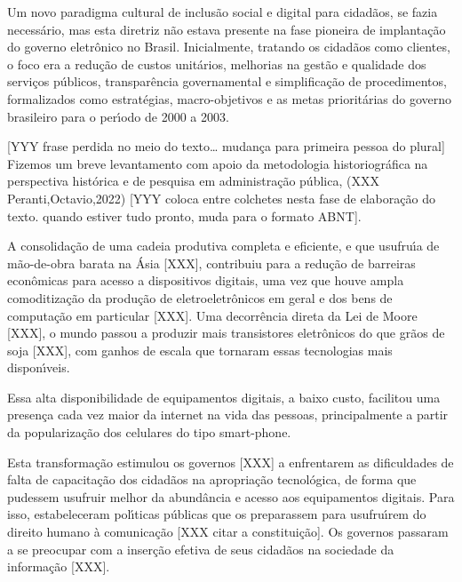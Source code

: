 \documentclass[
12pt,		%
openright,	%
twoside,  %
a4paper,			%
chapter=TITLE,		%
english,			%
french,				%
spanish,			%
brazil				%
]{USPSC-classe/USPSC_RedarTex}
\begin{document}
Um novo paradigma cultural de inclus\~ao social e digital para cidad\~aos, se fazia necess\'ario, mas esta diretriz n\~ao estava presente na fase pioneira de implanta\c{c}\~ao do governo eletr\^onico no Brasil. Inicialmente, tratando os cidad\~aos como clientes, o foco era a redu\c{c}\~ao de custos unit\'arios, melhorias na gest\~ao e qualidade dos servi\c{c}os p\'ublicos, transpar\^encia governamental e simplifica\c{c}\~ao de procedimentos, formalizados como estrat\'egias, macro-objetivos e  as metas priorit\'arias  do governo brasileiro para o per\'{\i}odo de 2000 a 2003.








[YYY frase perdida no meio do texto… mudan\c{c}a para primeira pessoa do plural] Fizemos um breve levantamento com apoio da metodologia historiogr\'afica na  perspectiva hist\'orica e de pesquisa em administra\c{c}\~ao p\'ublica, (XXX Peranti,Octavio,2022) [YYY coloca entre colchetes nesta fase de elabora\c{c}\~ao do texto. quando estiver tudo pronto, muda para o formato ABNT].








A consolida\c{c}\~ao de uma cadeia produtiva completa e eficiente, e que usufru\'{\i}a de m\~ao-de-obra barata na \'Asia [XXX], contribuiu para a redu\c{c}\~ao de barreiras econ\^omicas para acesso a dispositivos digitais, uma vez que houve ampla comoditiza\c{c}\~ao da produ\c{c}\~ao de eletroeletr\^onicos em geral e dos bens de computa\c{c}\~ao em particular [XXX]. Uma decorr\^encia direta da Lei de Moore [XXX], o mundo passou a produzir mais transistores eletr\^onicos do que gr\~aos de soja [XXX], com ganhos de escala que tornaram essas tecnologias mais dispon\'{\i}veis.








Essa alta disponibilidade de equipamentos digitais, a baixo custo, facilitou uma presen\c{c}a cada vez maior da internet na vida das pessoas, principalmente a partir da populariza\c{c}\~ao dos celulares do tipo \textquotedbl smart-phone.








Esta transforma\c{c}\~ao estimulou os governos [XXX] a enfrentarem as dificuldades  de falta de  capacita\c{c}\~ao dos cidad\~aos na apropria\c{c}\~ao tecnol\'ogica, de forma que pudessem usufruir melhor da abund\^ancia e acesso aos equipamentos digitais. Para isso, estabeleceram pol\'{\i}ticas p\'ublicas que os preparassem para usufru\'{\i}rem do direito humano \`a comunica\c{c}\~ao [XXX citar a constitui\c{c}\~ao]. Os governos passaram a se preocupar com a inser\c{c}\~ao efetiva de seus cidad\~aos na sociedade da informa\c{c}\~ao [XXX].
\end{document}
